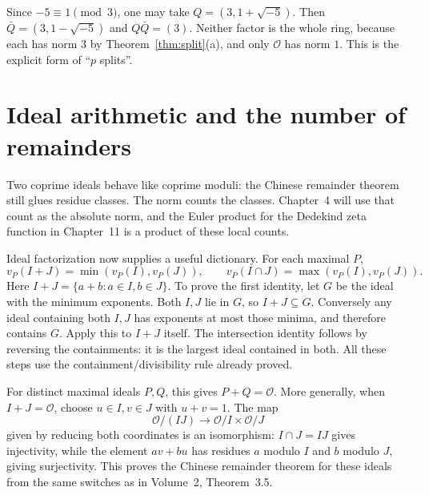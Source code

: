 \begin{examplex}
Since $-5\equiv 1\pmod 3$, one may take $Q=(3,1+\sqrt{-5})$. Then $\bar Q=(3,1-\sqrt{-5})$ and $Q\bar Q=(3)$. Neither factor is the whole ring, because each has norm $3$ by Theorem~\ref{thm:split}(a), and only $\mathcal O$ has norm $1$. This is the explicit form of ``$p$ splits''.
\end{examplex}

\section{Ideal arithmetic and the number of remainders}

Two coprime ideals behave like coprime moduli: the Chinese remainder theorem still glues residue classes. The norm counts the classes. Chapter~4 will use that count as the absolute norm, and the Euler product for the Dedekind zeta function in Chapter~11 is a product of these local counts.

Ideal factorization now supplies a useful dictionary. For each maximal $P$,
\[
v_P(I+J)=\min(v_P(I),v_P(J)),\qquad
v_P(I\cap J)=\max(v_P(I),v_P(J)).
\]
Here $I+J=\{a+b:a\in I,b\in J\}$.
To prove the first identity, let $G$ be the ideal with the minimum exponents.
Both $I,J$ lie in $G$, so $I+J\subseteq G$. Conversely any ideal containing
both $I,J$ has exponents at most those minima, and therefore contains $G$.
Apply this to $I+J$ itself. The intersection identity follows by reversing
the containments: it is the largest ideal contained in both.
All these steps use the containment/divisibility rule already proved.

For distinct maximal ideals $P,Q$, this gives $P+Q=\mathcal O$.
More generally, when $I+J=\mathcal O$, choose $u\in I,v\in J$
with $u+v=1$. The map
\[
\mathcal O/(IJ)\longrightarrow\mathcal O/I\times\mathcal O/J
\]
given by reducing both coordinates is an isomorphism:
$I\cap J=IJ$ gives injectivity, while the element $av+bu$
has residues $a$ modulo $I$ and $b$ modulo $J$, giving surjectivity.
This proves the Chinese remainder theorem for these ideals from the
same switches as in Volume~2, Theorem~3.5.

